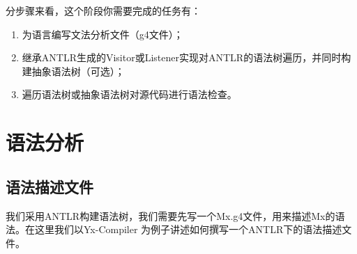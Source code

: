 分步骤来看，这个阶段你需要完成的任务有：
\begin{enumerate}
    \item 为语言编写文法分析文件（g4文件）；
    \item 继承ANTLR生成的Visitor或Listener实现对ANTLR的语法树遍历，并同时构建抽象语法树（可选）；
    \item 遍历语法树或抽象语法树对源代码进行语法检查。
\end{enumerate}





\section{语法分析}
\subsection{语法描述文件}
我们采用ANTLR构建语法树，我们需要先写一个Mx.g4文件，用来描述Mx的语法。在这里我们以Yx-Compiler%
为例子讲述如何撰写一个ANTLR下的语法描述文件。

